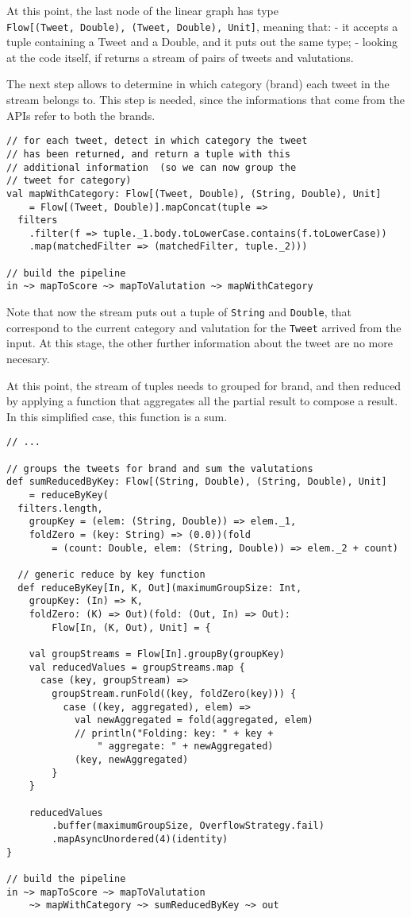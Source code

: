 At this point, the last node of the linear graph has type
\texttt{Flow{[}(Tweet,\ Double),\ (Tweet,\ Double),\ Unit{]}}, meaning
that: - it accepts a tuple containing a Tweet and a Double, and it puts
out the same type; - looking at the code itself, if returns a stream of
pairs of tweets and valutations.

The next step allows to determine in which category (brand) each tweet
in the stream belongs to. This step is needed, since the informations
that come from the APIs refer to both the brands.

\begin{verbatim}
// for each tweet, detect in which category the tweet
// has been returned, and return a tuple with this 
// additional information  (so we can now group the 
// tweet for category)
val mapWithCategory: Flow[(Tweet, Double), (String, Double), Unit]
    = Flow[(Tweet, Double)].mapConcat(tuple =>
  filters
    .filter(f => tuple._1.body.toLowerCase.contains(f.toLowerCase))
    .map(matchedFilter => (matchedFilter, tuple._2)))

// build the pipeline
in ~> mapToScore ~> mapToValutation ~> mapWithCategory
\end{verbatim}

Note that now the stream puts out a tuple of \texttt{String} and
\texttt{Double}, that correspond to the current category and valutation
for the \texttt{Tweet} arrived from the input. At this stage, the other
further information about the tweet are no more necesary.

At this point, the stream of tuples needs to grouped for brand, and then
reduced by applying a function that aggregates all the partial result to
compose a result. In this simplified case, this function is a sum.

\begin{verbatim}
// ...

// groups the tweets for brand and sum the valutations
def sumReducedByKey: Flow[(String, Double), (String, Double), Unit]
    = reduceByKey(
  filters.length,
    groupKey = (elem: (String, Double)) => elem._1,
    foldZero = (key: String) => (0.0))(fold
        = (count: Double, elem: (String, Double)) => elem._2 + count)

  // generic reduce by key function
  def reduceByKey[In, K, Out](maximumGroupSize: Int,
    groupKey: (In) => K,
    foldZero: (K) => Out)(fold: (Out, In) => Out):
        Flow[In, (K, Out), Unit] = {

    val groupStreams = Flow[In].groupBy(groupKey)
    val reducedValues = groupStreams.map {
      case (key, groupStream) =>
        groupStream.runFold((key, foldZero(key))) {
          case ((key, aggregated), elem) =>
            val newAggregated = fold(aggregated, elem)
            // println("Folding: key: " + key +
                " aggregate: " + newAggregated)
            (key, newAggregated)
        }
    }

    reducedValues
        .buffer(maximumGroupSize, OverflowStrategy.fail)
        .mapAsyncUnordered(4)(identity)
}

// build the pipeline
in ~> mapToScore ~> mapToValutation
    ~> mapWithCategory ~> sumReducedByKey ~> out
\end{verbatim}

